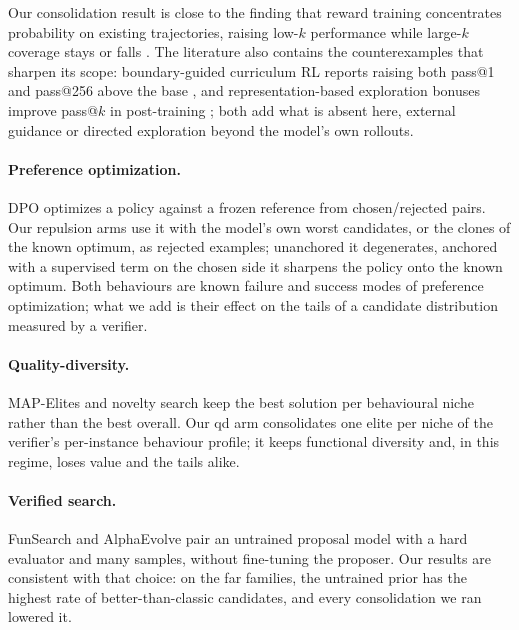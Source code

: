 \documentclass[11pt]{article}
\begin{document}
Our consolidation result is close to the finding that reward training
concentrates probability on existing trajectories, raising low-$k$
performance while large-$k$ coverage stays or falls
\citep{yue2025rlvr}. The literature also contains the counterexamples
that sharpen its scope: boundary-guided curriculum RL reports raising
both pass@1 and pass@256 above the base \citep{cai2026curriculum}, and
representation-based exploration bonuses improve pass@$k$ in
post-training \citep{tuyls2025representation}; both add what is absent
here, external guidance or directed exploration beyond the model's own
rollouts.

\paragraph{Preference optimization.} DPO \citep{rafailov2023dpo} optimizes a
policy against a frozen reference from chosen/rejected pairs. Our repulsion
arms use it with the model's own worst candidates, or the clones of the
known optimum, as rejected examples; unanchored it degenerates, anchored
with a supervised term on the chosen side it sharpens the policy onto the
known optimum. Both behaviours are known failure and success modes of
preference optimization; what we add is their effect on the tails of a
candidate distribution measured by a verifier.

\paragraph{Quality-diversity.} MAP-Elites \citep{mouret2015mapelites} and
novelty search \citep{lehman2011novelty,stanley2015greatness} keep the best
solution per behavioural niche rather than the best overall. Our qd arm
consolidates one elite per niche of the verifier's per-instance behaviour
profile; it keeps functional diversity and, in this regime, loses value and
the tails alike.

\paragraph{Verified search.} FunSearch \citep{romeraparedes2024funsearch}
and AlphaEvolve \citep{novikov2025alphaevolve} pair an untrained proposal
model with a hard evaluator and many samples, without fine-tuning the
proposer. Our results are consistent with that choice: on the far
families, the untrained prior has the highest rate of better-than-classic
candidates, and every consolidation we ran lowered it.
\end{document}
